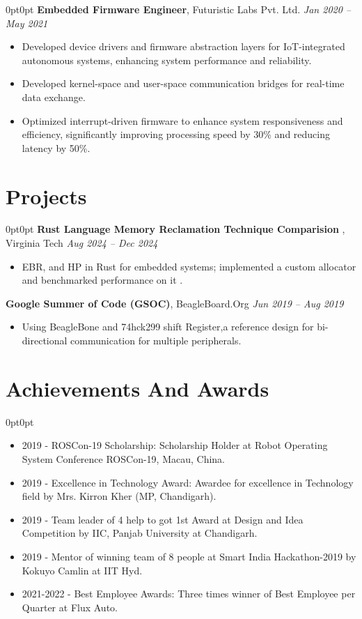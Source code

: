 \documentclass[10pt, letterpaper]{article}
\newenvironment{onecolentry}{\begin{adjustwidth}{0pt}{0pt}}{\end{adjustwidth}}
\newenvironment{highlights}{\begin{itemize}[leftmargin=10pt, itemsep=-2pt]}{\end{itemize}}
\begin{document}
\begin{onecolentry}
\textbf{Embedded Firmware Engineer}, Futuristic Labs Pvt. Ltd. \hfill \textit{Jan 2020 -- May 2021}
\begin{highlights}
    \item Developed device drivers and firmware abstraction layers for IoT-integrated autonomous systems, enhancing system performance and reliability.
    \item Developed kernel-space and user-space communication bridges for real-time data exchange.
    \item Optimized interrupt-driven firmware to enhance system responsiveness and efficiency, significantly improving processing speed by 30\% and reducing latency by 50\%.
\end{highlights}

\end{onecolentry}


\section{Projects}
\begin{onecolentry}
\textbf{Rust Language Memory Reclamation Technique Comparision }, Virginia Tech \hfill \textit{Aug 2024 -- Dec 2024}
\begin{highlights}
    \item EBR, and HP in Rust for embedded systems; implemented a custom allocator and benchmarked performance on it .
\end{highlights}
\textbf{Google Summer of Code (GSOC)}, BeagleBoard.Org \hfill \textit{Jun 2019 -- Aug 2019}

\begin{highlights}
    \item Using BeagleBone and 74hck299 shift Register,a reference design for bi-directional communication for multiple peripherals.
\end{highlights}
\end{onecolentry}

\section{Achievements And Awards}
\begin{onecolentry}
\begin{highlights}
    \item 2019 - ROSCon-19 Scholarship: Scholarship Holder at Robot Operating System Conference ROSCon-19, Macau, China.
    \item 2019 - Excellence in Technology Award: Awardee for excellence in Technology field by Mrs. Kirron Kher (MP, Chandigarh).
    \item 2019 - Team leader of 4 help to got 1st Award at Design and Idea Competition by IIC, Panjab University at Chandigarh.
    \item 2019 - Mentor of winning team of 8 people at Smart India Hackathon-2019 by Kokuyo Camlin at IIT Hyd.
    \item 2021-2022 - Best Employee Awards: Three times winner of Best Employee per Quarter at Flux Auto.
\end{highlights}
\end{onecolentry}
\end{document}

